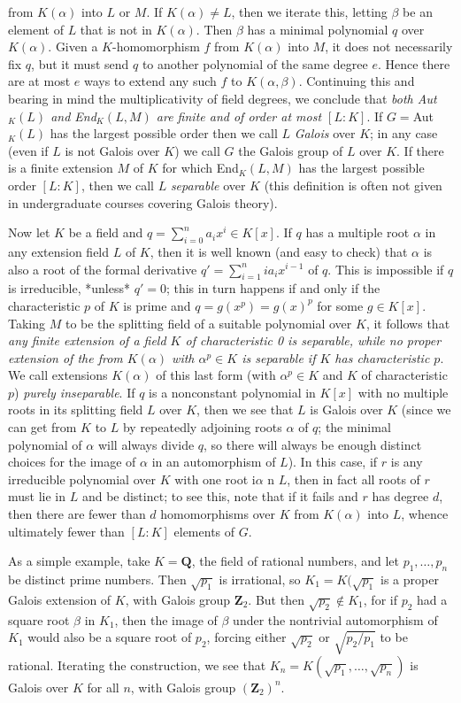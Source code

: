 \documentclass[10pt]{article}
\begin{document}
from $K(\alpha)$ into $L$ or $M$. If $K(\alpha)\ne L$, then we iterate
this, letting $\beta$ be an element of $L$ that is not in $K(\alpha)$.
Then $\beta$ has a minimal polynomial $q$ over $K(\alpha)$. Given a
$K$-homomorphism $f$ from $K(\alpha)$ into $M$, it does not necessarily
fix $q$, but it must send $q$ to another polynomial of the same degree
$e$. Hence there are at most $e$ ways to extend any such $f$ to
$K(\alpha,\beta)$. Continuing this and bearing in mind the
multiplicativity of field degrees, we conclude that {\sl both Aut$_K(L)$
  and End$_K(L,M)$ are finite and of order at most $[L:K]$}. If
$G=$Aut$_K(L)$ has the largest possible order then we call $L$ {\sl
  Galois} over $K$; in any case (even if $L$ is not Galois over $K$) we
call $G$ the Galois group of $L$ over $K$. If there is a finite
extension $M$ of $K$ for which End$_K(L,M)$ has the largest possible
order $[L:K]$, then we call $L$ {\sl separable} over $K$ (this
definition is often not given in undergraduate courses covering Galois
theory).

Now let $K$ be a field and $q=\sum_{i=0}^n a_i x^i \in K[x]$. If $q$ has
a multiple root $\alpha$ in any extension field $L$ of $K$, then it is
well known (and easy to check) that $\alpha$ is also a root of the
formal derivative $q' = \sum_{i=1}^n ia_i x^{i-1}$ of $q$. This is
impossible if $q$ is irreducible, *unless* $q' = 0$; this in turn
happens if and only if the characteristic $p$ of $K$ is prime and $q =
g(x^p) = g(x)^p$ for some $g\in K[x]$. Taking $M$ to be the splitting
field of a suitable polynomial over $K$, it follows that {\sl any finite
  extension of a field $K$ of characteristic 0 is separable, while no
  proper extension of the from $K(\alpha)$ with $\alpha^p\in K$ is
  separable if $K$ has characteristic $p$}. We call extensions
$K(\alpha)$ of this last form (with $\alpha^p\in K$ and $K$ of
characteristic $p$) {\sl purely inseparable}. If $q$ is a nonconstant
polynomial in $K[x]$ with no multiple roots in its splitting field $L$
over $K$, then we see that $L$ is Galois over $K$ (since we can get from
$K$ to $L$ by repeatedly adjoining roots $\alpha$ of $q$; the minimal
polynomial of $\alpha$ will always divide $q$, so there will always be
enough distinct choices for the image of $\alpha$ in an automorphism of
$L$). In this case, if $r$ is any irreducible polynomial over $K$ with
one root i$\alpha$ n $L$, then in fact all roots of $r$ must lie in $L$
and be distinct; to see this, note that if it fails and $r$ has degree
$d$, then there are fewer than $d$ homomorphisms over $K$ from
$K(\alpha)$ into $L$, whence ultimately fewer than $[L:K]$ elements of
$G$.

As a simple example, take $K=\mathbf Q$, the field of rational numbers,
and let $p_1,\ldots,p_n$ be distinct prime numbers. Then $\sqrt{p_1}$ is
irrational, so $K_1=K(\sqrt{p_1}$ is a proper Galois extension of $K$,
with Galois group $\mathbf Z_2$. But then $\sqrt{p_2}\notin K_1$, for if
$p_2$ had a square root $\beta$ in $K_1$, then the image of $\beta$
under the nontrivial automorphism of $K_1$ would also be a square root
of $p_2$, forcing either $\sqrt{p_2}$ or $\sqrt{p_2/p_1}$ to be
rational. Iterating the construction, we see that $K_n =
K(\sqrt{p_1},\ldots,\sqrt{p_n})$ is Galois over $K$ for all $n$, with
Galois group $(\mathbf Z_2)^n$.
\end{document}
